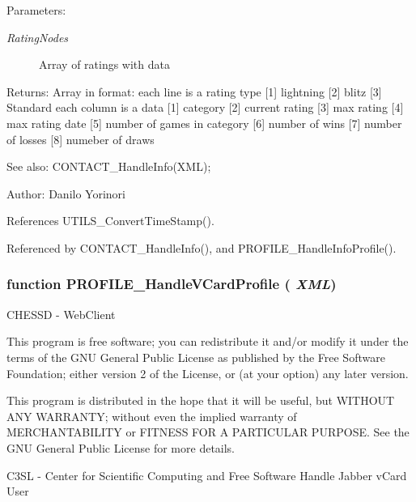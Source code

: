 \begin{Desc}
\item[Parameters:]
\begin{description}
\item[{\em RatingNodes}]Array of ratings with data \end{description}
\end{Desc}
\begin{Desc}
\item[Returns:]Array in format: each line is a rating type [1] lightning [2] blitz [3] Standard each column is a data [1] category [2] current rating [3] max rating [4] max rating date [5] number of games in category [6] number of wins [7] number of losses [8] numeber of draws \end{Desc}
\begin{Desc}
\item[See also:]CONTACT\_\-HandleInfo(XML); \end{Desc}
\begin{Desc}
\item[Author:]Danilo Yorinori \end{Desc}


References UTILS\_\-ConvertTimeStamp().

Referenced by CONTACT\_\-HandleInfo(), and PROFILE\_\-HandleInfoProfile().
\subsubsection{\setlength{\rightskip}{0pt plus 5cm}function PROFILE\_\-HandleVCardProfile ( {\em XML})}\label{profile_2profile_8js_a586925d93cc9cb8533756778acacce2}


CHESSD - WebClient

This program is free software; you can redistribute it and/or modify it under the terms of the GNU General Public License as published by the Free Software Foundation; either version 2 of the License, or (at your option) any later version.

This program is distributed in the hope that it will be useful, but WITHOUT ANY WARRANTY; without even the implied warranty of MERCHANTABILITY or FITNESS FOR A PARTICULAR PURPOSE. See the GNU General Public License for more details.

C3SL - Center for Scientific Computing and Free Software Handle Jabber vCard User

